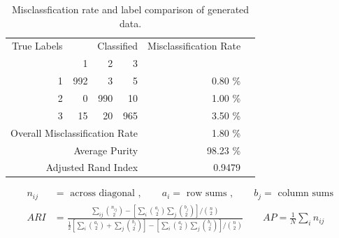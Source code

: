 \documentclass[11pt,letterpaper]{article}
\numberwithin{equation}{section}
\numberwithin{equation}{section}
\numberwithin{equation}{section}
\begin{document}
\begin{table}[!htb]
\begin{center}
\caption{Misclassfication rate and label comparison of generated data.}
\label{misclassTable}
\begin{tabular}{r r r r r r}
\hline\hline
    True Labels       &  \multicolumn{3}{r}{ Classified }   & Misclassification Rate  &  \\ \cmidrule{2-4}
   & 1                              & 2   & 3   &                            &  \\ \hline
1              & 992                            & 3   & 5   & 0.80 \%                                      &  \\
2              & 0                              & 990 & 10  & 1.00 \%                                       &  \\
3              & 15                             & 20  & 965 & 3.50 \%                                      &  \\  \hline
                \multicolumn{4}{r}{Overall Misclassification Rate}        & 1.80 \%                  & \\
        		\multicolumn{4}{r}{Average Purity} & 98.23 \%  
        		\\ \hline
                \multicolumn{4}{r}{Adjusted Rand Index} & 0.9479 &  \\
    \hline\hline
\end{tabular}
\end{center}
\begin{align*}
n_{ij} &= \text{ across diagonal }, \quad\quad  a_i = \text{ row sums }, \quad\quad b_j = \text { column sums } \\
 ARI &= \frac{ \sum_{ij} \binom{n_{ij}}{2} - [\sum_i \binom{a_i}{2} \sum_j \binom{b_j}{2}] / \binom{n}{2} }{ \frac{1}{2} [\sum_i \binom{a_i}{2} + \sum_j \binom{b_j}{2}] - [\sum_i \binom{a_i}{2} \sum_j \binom{b_j}{2}] / \binom{n}{2} } \quad\quad AP = \frac{1}{N} \sum_i  n_{ij}
\end{align*}
\end{table}
\end{document}
